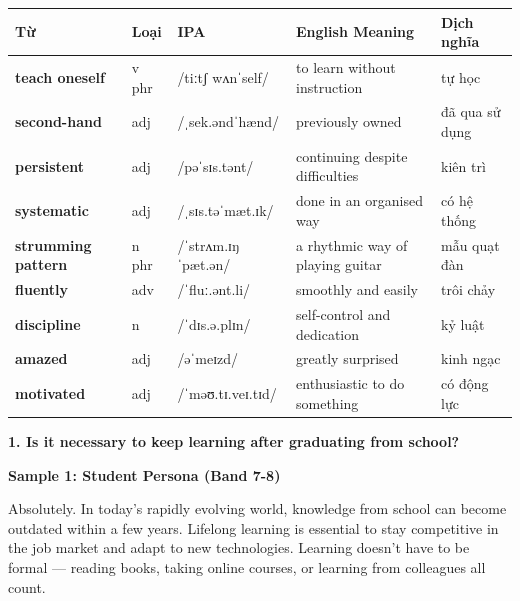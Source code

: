 \vspace{0.8em}
\begin{center}
\renewcommand{\arraystretch}{1.65}
\begin{tabularx}{\textwidth}{|V{0.22\textwidth}|C{0.07\textwidth}|I{0.20\textwidth}|Y|V{0.18\textwidth}|}
\hline
{}
\textbf{Từ} & \textbf{Loại} & \textbf{IPA} & \textbf{English Meaning} & \textbf{Dịch nghĩa} \\
\hline
\textbf{teach oneself} & v phr & /tiːtʃ wʌnˈself/ & to learn without instruction & tự học \\ \hline
\textbf{second-hand} & adj & /ˌsek.əndˈhænd/ & previously owned & đã qua sử dụng \\ \hline
\textbf{persistent} & adj & /pəˈsɪs.tənt/ & continuing despite difficulties & kiên trì \\ \hline
\textbf{systematic} & adj & /ˌsɪs.təˈmæt.ɪk/ & done in an organised way & có hệ thống \\ \hline
\textbf{strumming pattern} & n phr & /ˈstrʌm.ɪŋ ˈpæt.ən/ & a rhythmic way of playing guitar & mẫu quạt đàn \\ \hline
\textbf{fluently} & adv & /ˈfluː.ənt.li/ & smoothly and easily & trôi chảy \\ \hline
\textbf{discipline} & n & /ˈdɪs.ə.plɪn/ & self-control and dedication & kỷ luật \\ \hline
\textbf{amazed} & adj & /əˈmeɪzd/ & greatly surprised & kinh ngạc \\ \hline
\textbf{motivated} & adj & /ˈməʊ.tɪ.veɪ.tɪd/ & enthusiastic to do something & có động lực \\ \hline
\end{tabularx}
\end{center}

\partthreeheader

\begin{ieltsquestion}
\textbf{1. Is it necessary to keep learning after graduating from school?}
\end{ieltsquestion}
\textbf{Sample 1: Student Persona (Band 7-8)}

Absolutely. In today's rapidly evolving world, knowledge from school can become outdated within a few years. Lifelong learning is essential to stay competitive in the job market and adapt to new technologies. Learning doesn't have to be formal — reading books, taking online courses, or learning from colleagues all count.

\separator

